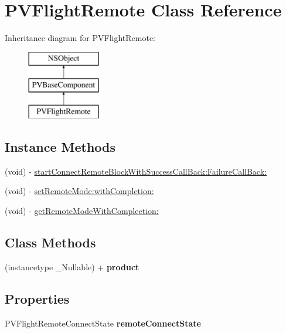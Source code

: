 \hypertarget{interface_p_v_flight_remote}{}\section{P\+V\+Flight\+Remote Class Reference}
\label{interface_p_v_flight_remote}
Inheritance diagram for P\+V\+Flight\+Remote\+:\begin{figure}[H]
\begin{center}
\leavevmode
\includegraphics[height=3.000000cm]{interface_p_v_flight_remote}
\end{center}
\end{figure}
\subsection*{Instance Methods}
\begin{DoxyCompactItemize}
\item 
(void) -\/ \hyperlink{interface_p_v_flight_remote_ab89720a2eb5c454cae9b9089d265ba1b}{start\+Connect\+Remote\+Block\+With\+Success\+Call\+Back\+:\+Failure\+Call\+Back\+:}
\item 
(void) -\/ \hyperlink{interface_p_v_flight_remote_a149edf47f82fa3d0ad707c81ca114cdf}{set\+Remote\+Mode\+:with\+Completion\+:}
\item 
(void) -\/ \hyperlink{interface_p_v_flight_remote_a2c02b505033ffbb16e10a8f0d1a10923}{get\+Remote\+Mode\+With\+Complection\+:}
\end{DoxyCompactItemize}
\subsection*{Class Methods}
\begin{DoxyCompactItemize}
\item 
\mbox{\label{interface_p_v_flight_remote_a126c854fe43f0b44dbaaea18adfa4b5c}} 
(instancetype \+\_\+\+Nullable) + {\bfseries product}
\end{DoxyCompactItemize}
\subsection*{Properties}
\begin{DoxyCompactItemize}
\item 
\mbox{\label{interface_p_v_flight_remote_a603ca84ea7e83754be0aa355683d949a}} 
P\+V\+Flight\+Remote\+Connect\+State {\bfseries remote\+Connect\+State}
\end{DoxyCompactItemize}


